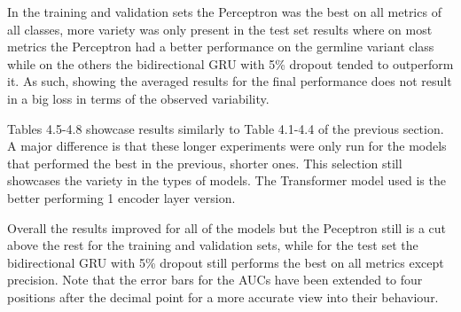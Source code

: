 \documentclass[bsc,frontabs,singlespacing,parskip,deptreport]{infthesis}
\begin{document}
In the training and validation sets the Perceptron was the best on all metrics of all classes, more variety was only present in the test set results where on most metrics the Perceptron had a better performance on the germline variant class while on the others the bidirectional GRU with 5\% dropout tended to outperform it. As such, showing the averaged results for the final performance does not result in a big loss in terms of the observed variability.

Tables 4.5-4.8 showcase results similarly to Table 4.1-4.4 of the previous section. A major difference is that these longer experiments were only run for the models that performed the best in the previous, shorter ones. This selection still showcases the variety in the types of models. The Transformer model used is the better performing 1 encoder layer version.

Overall the results improved for all of the models but the Peceptron still is a cut above the rest for the training and validation sets, while for the test set the bidirectional GRU with 5\% dropout still performs the best on all metrics except precision. Note that the error bars for the AUCs have been extended to four positions after the decimal point for a more accurate view into their behaviour.

\begin{table}
\begin{center}
\caption{Training set performance when training time was doubled.}
\end{center}
\vskip -3mm
\end{table}
\end{document}
